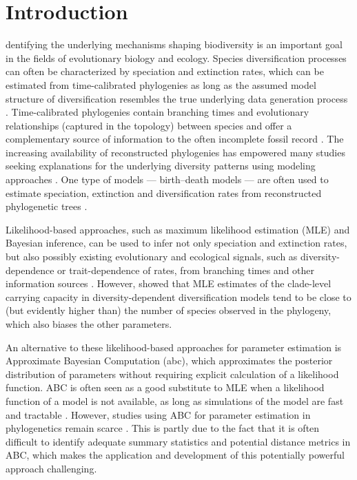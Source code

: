 \clearpage
{ %
\renewcommand{\subsectionautorefname}{Appendix}

\section{Introduction}
\label{ch2::sec::introduction}
dentifying the underlying mechanisms shaping biodiversity is an important goal in the fields of evolutionary biology and ecology. Species diversification processes can often be characterized by speciation and extinction rates, which can be estimated from time-calibrated phylogenies \citep{nee_reconstructed_1994} as long as the assumed model structure of diversification resembles the true underlying data generation process \citep{louca_why_2021}. Time-calibrated phylogenies contain branching times and evolutionary relationships (captured in the topology) between species and offer a complementary source of information to the often incomplete fossil record \citep{kidwell_quality_1996}. The increasing availability of reconstructed phylogenies has empowered many studies seeking explanations for the underlying diversity patterns using modeling approaches \citep{wagner_phylogenetic_2000, morlon_phylogenetic_2014, etienne_how_2016}. One type of models --- birth--death models --- are often used to estimate speciation, extinction and diversification rates from reconstructed phylogenetic trees \citep{nee_reconstructed_1994, nee_extinction_1994, nee_inferring_2001, hey_using_1992}. 

Likelihood-based approaches, such as maximum likelihood estimation (MLE) and Bayesian inference, can be used to infer not only speciation and extinction rates, but also possibly existing evolutionary and ecological signals, such as diversity-dependence or trait-dependence of rates, from branching times and other information sources \citep{etienne_diversity-dependence_2012,etienne_estimating_2014, maddison_estimating_2007, alexander_quantifying_2016,valente_equilibrium_2015}. However, \citet{etienne_how_2016} showed that MLE estimates of the clade-level carrying capacity in diversity-dependent diversification models tend to be close to (but evidently higher than) the number of species observed in the phylogeny, which also biases the other parameters.

An alternative to these likelihood-based approaches for parameter estimation is Approximate Bayesian Computation (\acrshort{abc}), which approximates the posterior distribution of parameters without requiring explicit calculation of a likelihood function. ABC is often seen as a good substitute to MLE when a likelihood function of a model is not available, as long as simulations of the model are fast and tractable \citep{beaumont_approximate_2002, beaumont_approximate_2010, janzen_approximate_2015}. However, studies using ABC for parameter estimation in phylogenetics remain scarce \citep{rabosky_heritability_2009,bokma_time_2010,kutsukake_simulation-based_2013,xie_can_2023}. This is partly due to the fact that it is often difficult to identify adequate summary statistics and potential distance metrics in ABC, which makes the application and development of this potentially powerful approach challenging.

}
